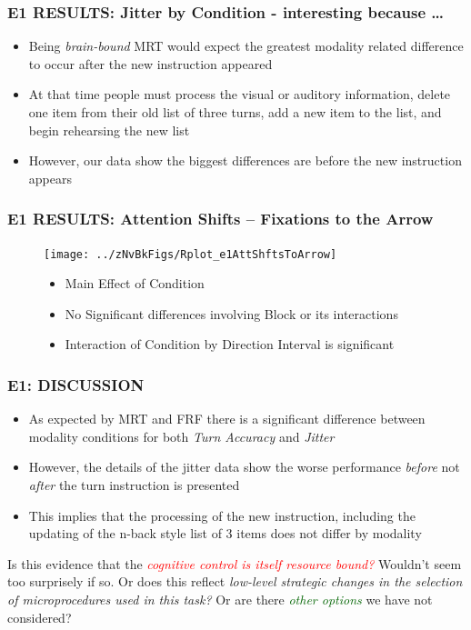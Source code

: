 \documentclass{beamer}
\begin{document}
\begin{frame} 
	\frametitle{E1 RESULTS: Jitter by Condition - interesting because \dots}
	\begin{itemize}
		\item Being \emph{brain-bound} MRT would expect the greatest modality related difference to occur \alert{after} the new instruction appeared
		\item At that time people must process the visual or auditory information, delete one item from their old list of three turns, add a new item to the list, and begin rehearsing the new list
		\pause
		\item However, our data show the biggest differences are \alert{before} the new instruction appears

	\end{itemize}
\end{frame}

\begin{frame} 
	\frametitle{E1 RESULTS: Attention Shifts -- Fixations to the Arrow}
	\begin{figure}
		\centering
		\texttt{[image: ../zNvBkFigs/Rplot\_e1AttShftsToArrow]}
		\begin{itemize}
			\item Main Effect of Condition
			\item No Significant differences involving Block or its interactions
			\item Interaction of Condition by Direction Interval is significant
		\end{itemize}

	\end{figure}
\end{frame}

\begin{frame}
	\frametitle{E1: DISCUSSION}
	\begin{itemize}
		\item As expected by MRT and FRF there is a significant difference between modality conditions for both \emph{Turn Accuracy} and \emph{Jitter}
		\item However, the details of the jitter data show the worse performance \emph{before} not \emph{after} the turn instruction is presented
		\item This implies that the processing of the new instruction, including the updating of the n-back style list of 3 items does not differ by modality
	\end{itemize}
Is this evidence that the \emph{\textcolor{red}{cognitive control is itself resource bound?}} Wouldn't seem too surprisely if so.  Or does this reflect \emph{\textcolor{wdgRed}{low-level strategic changes in the selection of microprocedures used in this task?}} Or are there \emph{\textcolor{darkgreen}{other options}} we have not considered?
\end{frame}
\end{document}

